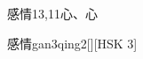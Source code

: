\begin{entry}{感情}{13,11}{⼼、⼼}
  \begin{phonetics}{感情}{gan3qing2}[][HSK 3]
  \end{phonetics}
\end{entry}
